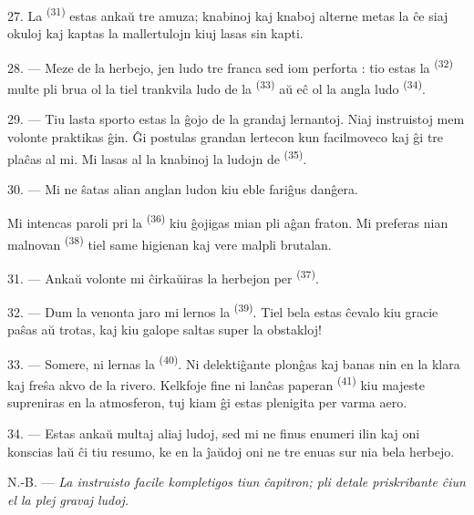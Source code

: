 27. La  \textsuperscript{(31)} estas ankaŭ tre amuza;
knabinoj kaj knaboj alterne metas la  ĉe siaj okuloj kaj
kaptas la mallertulojn kiuj lasas sin kapti.

28. --- Meze de la herbejo, jen ludo tre franca sed iom perforta : tio estas
la  \textsuperscript{(32)} multe pli brua ol la tiel trankvila
ludo de la  \textsuperscript{(33)} aŭ eĉ ol la angla ludo
 \textsuperscript{(34)}.

29. --- Tiu lasta sporto estas la ĝojo de la grandaj lernantoj. Niaj
instruistoj mem volonte praktikas ĝin. Ĝi postulas grandan lertecon kun
facilmoveco kaj ĝi tre plaĉas al mi. Mi lasas al la knabinoj la ludojn de
 \textsuperscript{(35)}.

30. --- Mi ne ŝatas alian anglan ludon kiu eble fariĝus danĝera.

Mi intencas paroli pri la  \textsuperscript{(36)} kiu
ĝojigas mian pli aĝan fraton. Mi preferas nian malnovan 
\textsuperscript{(38)} tiel same higienan kaj vere malpli brutalan.

\VUsaut{4.6mm}
\VUsaut{3.0mm}

31. --- Ankaŭ volonte mi ĉirkaŭiras la herbejon per 
\textsuperscript{(37)}.

32. --- Dum la venonta jaro mi lernos la 
\textsuperscript{(39)}. Tiel bela estas ĉevalo kiu gracie paŝas aŭ trotas, kaj
kiu galope saltas super la obstakloj!

33. --- Somere, ni lernas la  \textsuperscript{(40)}. Ni
delektiĝante plonĝas kaj banas nin en la klara kaj freŝa akvo de la rivero.
Kelkfoje fine ni lanĉas paperan  \textsuperscript{(41)} kiu
majeste supreniras en la atmosferon, tuj kiam ĝi estas plenigita per varma
aero.

34. --- Estas ankaŭ multaj aliaj ludoj, sed mi ne finus enumeri ilin kaj oni
konscias laŭ ĉi tiu resumo, ke en la ĵaŭdoj oni ne tre enuas sur nia bela
herbejo.

N.-B. --- \textit{La instruisto facile kompletigos tiun ĉapitron; pli detale
priskribante ĉiun el la plej gravaj ludoj.}
\VUsaut{6.0mm}
\VUfilet{22mm}
